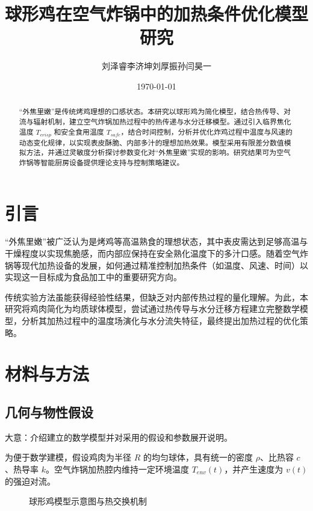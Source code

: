 \documentclass[12pt]{article}
\title{球形鸡在空气炸锅中的加热条件优化模型研究}
\author{刘泽睿\quad 李济坤\quad 刘厚振\quad 孙闫昊一}
\date{\today}
\begin{document}
\maketitle

\begin{abstract}
“外焦里嫩”是传统烤鸡理想的口感状态。本研究以球形鸡为简化模型，结合热传导、对流与辐射机制，建立空气炸锅加热过程中的热传递与水分迁移模型。通过引入临界焦化温度 $T_{crisp}$ 和安全食用温度 $T_{safe}$，结合时间控制，分析并优化炸鸡过程中温度与风速的动态变化规律，以实现表皮酥脆、内部多汁的理想加热效果。模型采用有限差分数值模拟方法，并通过灵敏度分析探讨参数变化对“外焦里嫩”实现的影响。研究结果可为空气炸锅等智能厨房设备提供理论支持与控制策略建议。
\end{abstract}

\section{引言}
“外焦里嫩”被广泛认为是烤鸡等高温熟食的理想状态，其中表皮需达到足够高温与干燥程度以实现焦脆感，而内部应保持在安全熟化温度下的多汁口感。随着空气炸锅等现代加热设备的发展，如何通过精准控制加热条件（如温度、风速、时间）以实现这一目标成为食品加工中的重要研究方向。

传统实验方法虽能获得经验性结果，但缺乏对内部传热过程的量化理解。为此，本研究将鸡肉简化为均质球体模型，尝试通过热传导与水分迁移方程建立完整数学模型，分析其加热过程中的温度场演化与水分流失特征，最终提出加热过程的优化策略。\cite{example}

\section{材料与方法}

\subsection{几何与物性假设}
大意：介绍建立的数学模型并对采用的假设和参数展开说明。 
\par 为便于数学建模，假设鸡肉为半径 $R$ 的均匀球体，具有统一的密度 $\rho$、比热容 $c$、热导率 $k$。空气炸锅加热腔内维持一定环境温度 $T_{env}(t)$，并产生速度为 $v(t)$ 的强迫对流。


\begin{figure}[htbp]
\centering
\caption{球形鸡模型示意图与热交换机制}
\label{fig:model}
\end{figure}
\end{document}
